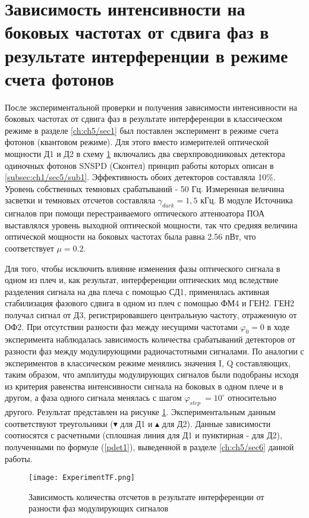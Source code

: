 \section{Зависимость интенсивности на боковых частотах от сдвига фаз в результате интерференции в режиме счета фотонов} \label{ch:ch5/sec7}

После экспериментальной проверки и получения зависимости интенсивности на боковых частотах от сдвига фаз в результате интерференции в классическом режиме в разделе \ref{ch:ch5/sec1} был поставлен эксперимент в режиме счета фотонов (квантовом режиме). Для этого вместо измерителей оптической мощности Д1 и Д2 в схему \ref{fig:Experimental_TF} включались два сверхпроводниковых детектора одиночных фотонов SNSPD (Сконтел) принцип работы которых описан в \ref{subsec:ch1/sec5/sub1}. Эффективность обоих детекторов составляла 10\%. Уровень собственных темновых срабатываний - 50 Гц. Измеренная величина засветки и темновых отсчетов составляла $\gamma_{dark}=1,5$ кГц. В модуле Источника сигналов при помощи перестраиваемого оптического аттенюатора ПОА выставлялся уровень выходной оптической мощности, так что средняя величина оптической мощности на боковых частотах была равна 2.56 пВт, что соответствует $\mu=0.2$.  

 Для того, чтобы исключить влияние изменения фазы оптического сигнала в одном из плеч и, как результат, интерференции оптических мод вследствие разделения сигнала на два плеча с помощью СД1, применялась активная стабилизация фазового сдвига в одном из плеч с помощью ФМ4 и ГЕН2. ГЕН2 получал сигнал от Д3, регистрировавшего центральную частоту, отраженную от ОФ2. При отсутствии разности фаз между несущими частотами $\varphi_0=0$ в ходе эксперимента наблюдалась зависимость количества срабатываний детекторов от разности фаз между модулирующими радиочастотными сигналами. По аналогии с экспериментов в классическом режиме менялись значения I, Q составляющих, таким образом, что амплитуды модулирующих сигналов были подобраны исходя из критерия равенства интенсивности сигнала на боковых в одном плече и в другом, а фаза одного сигнала менялась с шагом $\varphi_{step}\ = 10^{\circ}$ относительно другого. Результат представлен на рисунке \ref{fig:Experimental_TF}. Экспериментальным данным соответствуют треугольники ($\blacktriangledown$ для Д1 и $\blacktriangle$ для Д2). Данные зависимости соотносятся с расчетными (сплошная линия для Д1 и пунктирная - для Д2), полученными по формуле (\ref{pdet1}), выведенной в разделе \ref{ch:ch5/sec6} данной работы. 

 \begin{figure}[ht]
  \centering
  \texttt{[image: ExperimentTF.png]}
  \caption{Зависимость количества отсчетов в результате интерференции от разности фаз модулирующих сигналов}
  \label{fig:Experimental_TF}
\end{figure}


